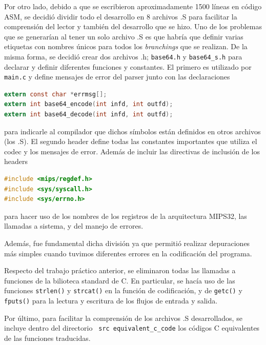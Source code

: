 Por otro lado, debido a que se escribieron aproximadamente 1500 líneas en código ASM, se decidió dividir todo el desarrollo en 8 archivos .S para facilitar la comprensión del lector y también del desarrollo que se hizo. Uno de los problemas que se generarían al tener un solo archivo .S es que habría que definir varias etiquetas con nombres únicos para todos los \emph{branchings} que se realizan. De la misma forma, se decidió crear dos archivos .h; \texttt{base64.h} y \texttt{base64\_s.h} para declarar y definir diferentes funciones y constantes. El primero es utilizado por \texttt{main.c} y define mensajes de error del parser junto con las declaraciones
\begin{lstlisting}[language=C, style=StyleC]
extern const char *errmsg[];
extern int base64_encode(int infd, int outfd);
extern int base64_decode(int infd, int outfd);
\end{lstlisting}
para indicarle al compilador que dichos símbolos están definidos en otros archivos (los .S). El segundo header define todas las constantes importantes que utiliza el codec y los mensajes de error. Además de incluir las directivas de inclusión de los headers
\begin{lstlisting}[language=C, style=StyleC]
#include <mips/regdef.h>
#include <sys/syscall.h>
#include <sys/errno.h>
\end{lstlisting}
para hacer uso de los nombres de los registros de la arquitectura MIPS32, las llamadas a sistema, y del manejo de errores.

Además, fue fundamental dicha división ya que permitió realizar depuraciones más simples cuando tuvimos diferentes errores en la codificación del programa.

Respecto del trabajo práctico anterior, se eliminaron todas las llamadas a funciones de la bilioteca standard de C. En particular, se hacía uso de las funciones \texttt{strlen()} y \texttt{strcat()} en la función de codificación, y de \texttt{getc()} y \texttt{fputs()} para la lectura y escritura de los flujos de entrada y salida.

Por último, para facilitar la comprensión de los archivos .S desarrollados, se incluye dentro del directorio \texttt{\ src\ equivalent\_c\_code} los códigos C equivalentes de las funciones traducidas.

